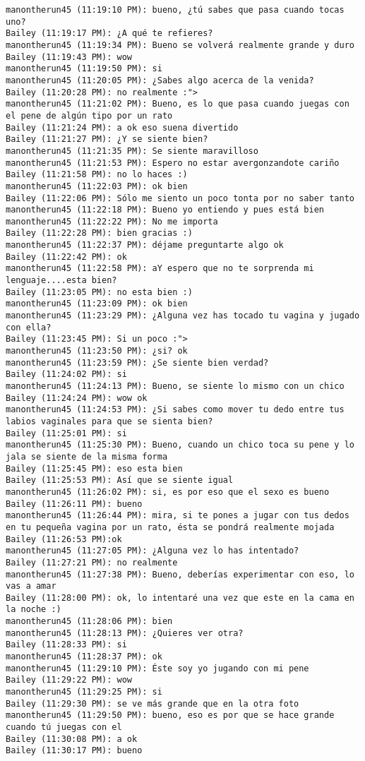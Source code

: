 \begin{verbatim}
manontherun45 (11:19:10 PM): bueno, ¿tú sabes que pasa cuando tocas uno?
Bailey (11:19:17 PM): ¿A qué te refieres?
manontherun45 (11:19:34 PM): Bueno se volverá realmente grande y duro
Bailey (11:19:43 PM): wow
manontherun45 (11:19:50 PM): si
manontherun45 (11:20:05 PM): ¿Sabes algo acerca de la venida?
Bailey (11:20:28 PM): no realmente :"> 
manontherun45 (11:21:02 PM): Bueno, es lo que pasa cuando juegas con el pene de algún tipo por un rato
Bailey (11:21:24 PM): a ok eso suena divertido
Bailey (11:21:27 PM): ¿Y se siente bien?
manontherun45 (11:21:35 PM): Se siente maravilloso
manontherun45 (11:21:53 PM): Espero no estar avergonzandote cariño
Bailey (11:21:58 PM): no lo haces :)
manontherun45 (11:22:03 PM): ok bien
Bailey (11:22:06 PM): Sólo me siento un poco tonta por no saber tanto
manontherun45 (11:22:18 PM): Bueno yo entiendo y pues está bien
manontherun45 (11:22:22 PM): No me importa
Bailey (11:22:28 PM): bien gracias :)
manontherun45 (11:22:37 PM): déjame preguntarte algo ok
Bailey (11:22:42 PM): ok
manontherun45 (11:22:58 PM): aY espero que no te sorprenda mi lenguaje....esta bien?
Bailey (11:23:05 PM): no esta bien :)
manontherun45 (11:23:09 PM): ok bien
manontherun45 (11:23:29 PM): ¿Alguna vez has tocado tu vagina y jugado con ella?
Bailey (11:23:45 PM): Si un poco :">
manontherun45 (11:23:50 PM): ¿si? ok
manontherun45 (11:23:59 PM): ¿Se siente bien verdad?
Bailey (11:24:02 PM): si
manontherun45 (11:24:13 PM): Bueno, se siente lo mismo con un chico
Bailey (11:24:24 PM): wow ok
manontherun45 (11:24:53 PM): ¿Si sabes como mover tu dedo entre tus labios vaginales para que se sienta bien?
Bailey (11:25:01 PM): si
manontherun45 (11:25:30 PM): Bueno, cuando un chico toca su pene y lo jala se siente de la misma forma
Bailey (11:25:45 PM): eso esta bien
Bailey (11:25:53 PM): Así que se siente igual
manontherun45 (11:26:02 PM): si, es por eso que el sexo es bueno
Bailey (11:26:11 PM): bueno
manontherun45 (11:26:44 PM): mira, si te pones a jugar con tus dedos en tu pequeña vagina por un rato, ésta se pondrá realmente mojada
Bailey (11:26:53 PM):ok
manontherun45 (11:27:05 PM): ¿Alguna vez lo has intentado?
Bailey (11:27:21 PM): no realmente
manontherun45 (11:27:38 PM): Bueno, deberías experimentar con eso, lo vas a amar
Bailey (11:28:00 PM): ok, lo intentaré una vez que este en la cama en la noche :)
manontherun45 (11:28:06 PM): bien
manontherun45 (11:28:13 PM): ¿Quieres ver otra?
Bailey (11:28:33 PM): si
manontherun45 (11:28:37 PM): ok
manontherun45 (11:29:10 PM): Éste soy yo jugando con mi pene
Bailey (11:29:22 PM): wow
manontherun45 (11:29:25 PM): si
Bailey (11:29:30 PM): se ve más grande que en la otra foto
manontherun45 (11:29:50 PM): bueno, eso es por que se hace grande cuando tú juegas con el
Bailey (11:30:08 PM): a ok
Bailey (11:30:17 PM): bueno
\end{verbatim}







